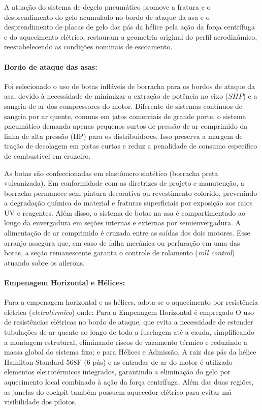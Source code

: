 A atuação do sistema de degelo pneumático promove a fratura e o desprendimento do gelo acumulado no bordo de ataque da asa e o desprendimento de placas de gelo das pás da hélice pela ação da força centrífuga e do aquecimento elétrico, restauram a geometria original do perfil aerodinâmico, reestabelecendo as condições nominais de escoamento. 

\paragraph{Bordo de ataque das asas:} Foi selecionado o uso de botas infláveis de borracha para os bordos de ataque da asa, devido à necessidade de minimizar a extração de potência no eixo ($SHP$) e a sangria de ar dos compressores do motor. Diferente de sistemas contínuos de sangria por ar quente, comuns em jatos comerciais de grande porte, o sistema pneumático demanda apenas pequenos surtos de pressão de ar comprimido da linha de alta pressão (HP) para os distribuidores. Isso preserva a margem de tração de decolagem em pistas curtas e reduz a penalidade de consumo específico de combustível em cruzeiro.

As botas são confeccionadas em elastômero sintético (borracha preta vulcanizada). Em conformidade com as diretrizes de projeto e manutenção, a borracha permanece sem pintura decorativa ou revestimento colorido, prevenindo a degradação química do material e fraturas superficiais por exposição aos raios UV e reagentes.
Além disso, o sistema de botas na asa é compartimentado ao longo da envergadura em seções internas e externas por semienvergadura. A alimentação de ar comprimido é cruzada entre as saídas dos dois motores. Esse arranjo assegura que, em caso de falha mecânica ou perfuração em uma das botas, a seção remanescente garanta o controle de rolamento (\textit{roll control}) atuando sobre os ailerons.

\paragraph{Empenagem Horizontal e Hélices:}Para a empenagem horizontal e as hélices, adota-se o aquecimento por resistência elétrica (\textit{eletrotérmico}) onde:
Para a Empenagem Horizontal é empregado O uso de resistências elétricas no bordo de ataque, que evita a necessidade de estender tubulações de ar quente ao longo de toda a fuselagem até a cauda, simplificando a montagem estrutural, eliminando riscos de vazamento térmico e reduzindo a massa global do sistema fixo;
e para Hélices e Admissão, A raiz das pás da hélice Hamilton Standard 568F (6 pás) e as entradas de ar do motor é utilizado elementos eletrotérmicos integrados, garantindo a eliminação do gelo por aquecimento local combinado à ação da força centrífuga.
Além das duas regiões, as janelas do cockpit também possuem aquecedor elétrico para evitar má visibilidade dos pilotos.

